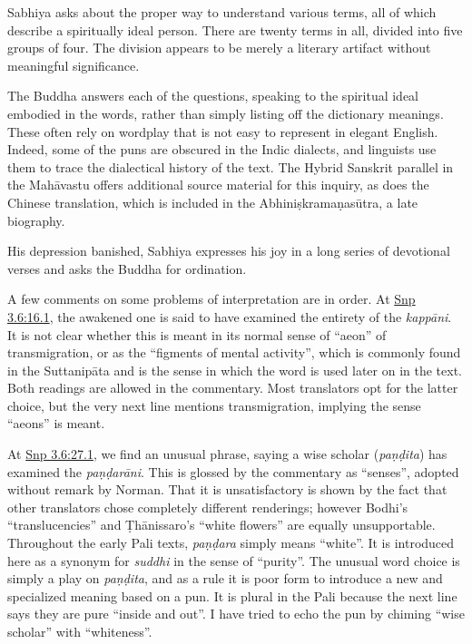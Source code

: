\documentclass[12pt,openany]{book}%
\begin{document}
Sabhiya asks about the proper way to understand various terms, all of which describe a spiritually ideal person. There are twenty terms in all, divided into five groups of four. The division appears to be merely a literary artifact without meaningful significance.

The Buddha answers each of the questions, speaking to the spiritual ideal embodied in the words, rather than simply listing off the dictionary meanings. These often rely on wordplay that is not easy to represent in elegant English. Indeed, some of the puns are obscured in the Indic dialects, and linguists use them to trace the dialectical history of the text. The Hybrid Sanskrit parallel in the \textsanskrit{Mahāvastu} offers additional source material for this inquiry, as does the Chinese translation, which is included in the \textsanskrit{Abhiniṣkramaṇasūtra}, a late biography.

His depression banished, Sabhiya expresses his joy in a long series of devotional verses and asks the Buddha for ordination.

A few comments on some problems of interpretation are in order. At \href{https://suttacentral.net/snp3.6/en/sujato\#16.1}{Snp 3.6:16.1}, the awakened one is said to have examined the entirety of the \textit{\textsanskrit{kappāni}}. It is not clear whether this is meant in its normal sense of “aeon” of transmigration, or as the “figments of mental activity”, which is commonly found in the \textsanskrit{Suttanipāta} and is the sense in which the word is used later on in the text. Both readings are allowed in the commentary. Most translators opt for the latter choice, but the very next line mentions transmigration, implying the sense “aeons” is meant.

At \href{https://suttacentral.net/snp3.6/en/sujato\#27.1}{Snp 3.6:27.1}, we find an unusual phrase, saying a wise scholar (\textit{\textsanskrit{paṇḍita}}) has examined the \textit{\textsanskrit{paṇḍarāni}}. This is glossed by the commentary as “senses”, adopted without remark by Norman. That it is unsatisfactory is shown by the fact that other translators chose completely different renderings; however Bodhi’s “translucencies” and \textsanskrit{Ṭhānissaro}’s “white flowers” are equally unsupportable. Throughout the early Pali texts, \textit{\textsanskrit{paṇḍara}} simply means “white”. It is introduced here as a synonym for \textit{suddhi} in the sense of “purity”. The unusual word choice is simply a play on \textit{\textsanskrit{paṇḍita}}, and as a rule it is poor form to introduce a new and specialized meaning based on a pun. It is plural in the Pali because the next line says they are pure “inside and out”. I have tried to echo the pun by chiming “wise scholar” with “whiteness”. 
\end{document}
